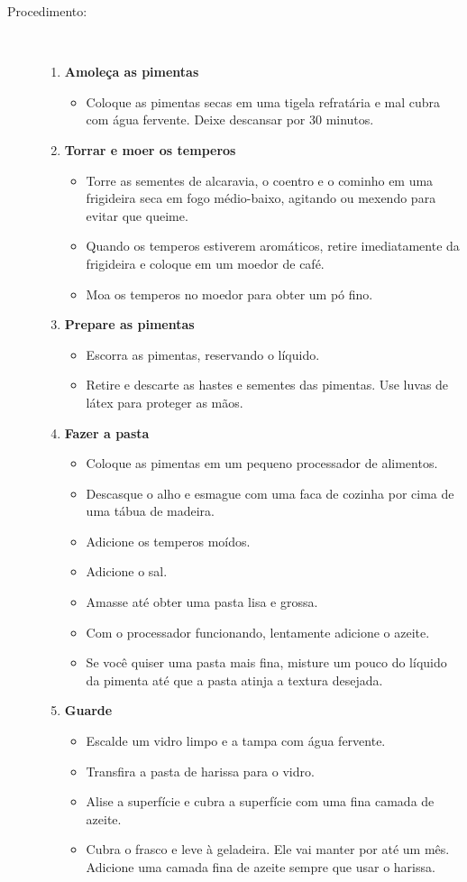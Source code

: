 \documentclass [11pt, papel de carta] {article}
\begin{document}
\begin {description}
\item [Procedimento:] \ \\
\begin {enumerate}
\item {\bf Amoleça as pimentas}
\begin {itemize}
\item Coloque as pimentas secas em uma tigela refratária e mal cubra com água fervente. Deixe descansar por 30 minutos.
\end {itemize}
\item {\bf Torrar e moer os temperos}
\begin {itemize}
\item Torre as sementes de alcaravia, o coentro e o cominho em uma frigideira seca em fogo médio-baixo, agitando ou mexendo para evitar que queime.
\item Quando os temperos estiverem aromáticos, retire imediatamente da frigideira e coloque em um moedor de café.
\item Moa os temperos no moedor para obter um pó fino.
\end {itemize}
\item {\bf Prepare as pimentas}
\begin {itemize}
\item Escorra as pimentas, reservando o líquido.
\item Retire e descarte as hastes e sementes das pimentas. Use luvas de látex para proteger as mãos.
\end {itemize}
\item {\bf Fazer a pasta}
\begin {itemize}
\item Coloque as pimentas em um pequeno processador de alimentos.
\item Descasque o alho e esmague com uma faca de cozinha por cima de uma tábua de madeira.
\item Adicione os temperos moídos.
\item Adicione o sal.
\item Amasse at\'e obter uma pasta lisa e grossa.
\item Com o processador funcionando, lentamente adicione o azeite.
\item Se você quiser uma pasta mais fina, misture um pouco do líquido da pimenta até que a pasta atinja a textura desejada.
\end {itemize}
\item {\bf Guarde}
\begin {itemize}
\item Escalde um vidro limpo e a tampa com água fervente.
\item Transfira a pasta de harissa para o vidro.
\item Alise a superfície e cubra a superfície com uma fina camada de azeite.
\item Cubra o frasco e leve à geladeira. Ele vai manter por até um mês. Adicione uma camada fina de azeite sempre que usar o harissa.
\end {itemize}
\end {enumerate}
\end {description}
\end{document}
